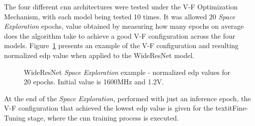The four different \acrshort{cnn} architectures were tested under the V-F Optimization Mechanism, with each model being tested 10 times. It was allowed 20 \textit{Space Exploration} epochs, value obtained by measuring how many epochs on average does the algorithm take to achieve a good V-F configuration across the four models. Figure~\ref{fig:3d} presents an example of the V-F configuration and resulting normalized \acrshort{edp} value when applied to the WideResNet model.

\begin{figure}[h]
\centering
    \caption{WideResNet \textit{Space Exploration} example - normalized \acrshort{edp} values for 20 epochs. Initial value is 1600MHz and 1.2V.}
    \label{fig:3d}
\end{figure}


At the end of the \textit{Space Exploration}, performed with just an inference epoch, the V-F configuration that achieved the lowest \acrshort{edp} value is given for the textit{Fine-Tuning} stage, where the \acrshort{cnn}  training process is executed.


